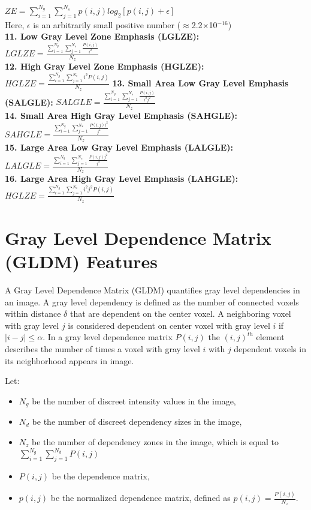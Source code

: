 $ZE=\sum _{i=1}^{N_{g}}\sum _{j=1}^{N_{s}}p\left(i,j\right)log_{2}\left[p\left(i,j\right)+\epsilon \right]$\\
Here, $\epsilon $ is an arbitrarily small positive number (${\approx}$2.2${\times}$10$^{-16}$)\\
\textbf{11. Low Gray Level Zone Emphasis (LGLZE):}\\
$\textit{LGLZE}=\frac{\sum _{i=1}^{N_{g}}\sum _{j=1}^{N_{s}}\frac{P\left(i,j\right)}{i^{2}}}{N_{z}}$\\
\textbf{12. High Gray Level Zone Emphasis (HGLZE):}\\
$\textit{HGLZE}=\frac{\sum _{i=1}^{N_{g}}\sum _{j=1}^{N_{s}}i^{2}P\left(i,j\right)}{N_{z}}$
\textbf{13. Small Area Low Gray Level Emphasis (SALGLE):}
$\textit{SALGLE}=\frac{\sum _{i=1}^{N_{g}}\sum _{j=1}^{N_{s}}\frac{P\left(i,j\right)}{i^{2}j^{2}}}{N_{z}}$\\
\textbf{14. Small Area High Gray Level Emphasis (SAHGLE):}\\
$\textit{SAHGLE}=\frac{\sum _{i=1}^{N_{g}}\sum _{j=1}^{N_{s}}\frac{P\left(i,j\right)i^{2}}{j^{2}}}{N_{z}}$\\
\textbf{15. Large Area Low Gray Level Emphasis (LALGLE):}\\
$\textit{LALGLE}=\frac{\sum _{i=1}^{N_{g}}\sum _{j=1}^{N_{s}}\frac{P\left(i,j\right)j^{2}}{i^{2}}}{N_{z}}$\\
\textbf{16. Large Area High Gray Level Emphasis (LAHGLE):}\\
$\textit{HGLZE}=\frac{\sum _{i=1}^{N_{g}}\sum _{j=1}^{N_{s}}i^{2}j^{2}P\left(i,j\right)}{N_{z}}$\\


\section{Gray Level Dependence Matrix (GLDM) Features}
A Gray Level Dependence Matrix (GLDM) quantifies gray level dependencies in an image. A gray level dependency is defined as the number of connected voxels within distance $\delta $ that are dependent on the center voxel. A neighboring voxel with gray level $j$ is considered dependent on center voxel with gray level $i$ if $\left| i-j\right| \leq \alpha $. In a gray level dependence matrix $P\left(i,j\right)$ the $\left(i,j\right)^{th}$ element describes the number of times a voxel with gray level $i$ with $j$ dependent voxels in its neighborhood appears in image.

Let:
\begin{itemize}
\item $N_{g}$ be the number of discreet intensity values in the image, 
\item $N_{d}$ be the number of discreet dependency sizes in the image,
\item $N_{z}$ be the number of dependency zones in the image, which is equal to $\sum _{i=1}^{N_{g}}\sum _{j=1}^{N_{d}}P\left(i,j\right)$
\item $P\left(i,j\right)$ be the dependence matrix,
\item $p\left(i,j\right)$ be the normalized dependence matrix, defined as $p\left(i,j\right)=\frac{P\left(i,j\right)}{N_{z}}$.
\end{itemize}


